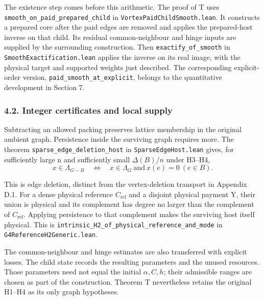 \documentclass[english,11pt,a4paper]{article}
\begin{document}
The existence step comes before this arithmetic. The proof of T uses \texttt{smooth\_\allowbreak{}on\_\allowbreak{}paid\_\allowbreak{}prepared\_\allowbreak{}child} in \texttt{Vortex\allowbreak{}Paid\allowbreak{}Child\allowbreak{}Smooth.\allowbreak{}lean}. It constructs a prepared core after the paid edges are removed and applies the prepared-host inverse on that child. Its residual common-neighbour and hinge inputs are supplied by the surrounding construction. Then \texttt{exactify\_\allowbreak{}of\_\allowbreak{}smooth} in \texttt{Smooth\allowbreak{}Exactification.\allowbreak{}lean} applies the inverse on its real image, with the physical target and supported weights just described. The corresponding explicit-order version, \texttt{paid\_\allowbreak{}smooth\_\allowbreak{}at\_\allowbreak{}explicit}, belongs to the quantitative development in Section 7.

\subsubsection{4.2. Integer certificates and local supply}\label{integer-certificates-and-local-supply}

Subtracting an allowed packing preserves lattice membership in the original ambient graph. Persistence inside the surviving graph requires more. The theorem \texttt{sparse\_\allowbreak{}edge\_\allowbreak{}deletion\_\allowbreak{}host} in \texttt{Sparse\allowbreak{}Edge\allowbreak{}Host.\allowbreak{}lean} gives, for sufficiently large n and sufficiently small \(\Delta(B)/n\) under H3--H4,
\[x\in\Lambda_{G-B}\quad\Longleftrightarrow\quad x\in\Lambda_G\ \text{and}\ x(e)=0\ (e\in B).\]

This is edge deletion, distinct from the vertex-deletion transport in Appendix D.1. For a dense physical reference \(C_{\mathrm{ref}}\) and a disjoint physical payment Y, their union is physical and its complement has degree no larger than the complement of \(C_{\mathrm{ref}}\). Applying persistence to that complement makes the surviving host itself physical. This is \texttt{intrinsic\_\allowbreak{}H2\_\allowbreak{}of\_\allowbreak{}physical\_\allowbreak{}reference\_\allowbreak{}and\_\allowbreak{}mode} in \texttt{G4Reference\allowbreak{}H2Generic.\allowbreak{}lean}.

The common-neighbour and hinge estimates are also transferred with explicit losses. The child state records the resulting parameters and the unused resources. Those parameters need not equal the initial \(\alpha,C,h\); their admissible ranges are chosen as part of the construction. Theorem T nevertheless retains the original H1--H4 as its only graph hypotheses.
\end{document}
